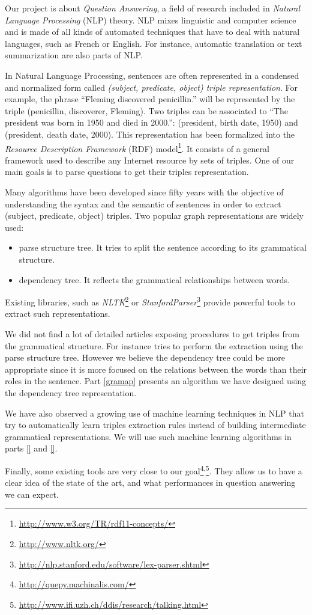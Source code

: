Our project is about \textit{Question Answering}, a field of research included in \textit{Natural Language Processing} (NLP) theory. NLP mixes linguistic and computer science and is made of all kinds of automated techniques that have to deal with natural languages, such as French or English. For instance, automatic translation or text summarization are also parts of NLP.

In Natural Language Processing, sentences are often represented in a condensed and normalized form called \textit{(subject, predicate, object) triple representation}. For example, the phrase ``Fleming discovered penicillin.'' will be represented by the triple (penicillin, discoverer, Fleming). Two triples can be associated to ``The president was born in 1950 and died in 2000.'': (president, birth date, 1950) and (president, death date, 2000). This representation has been formalized into the \textit{Resource Description Framework} (RDF) model\footnote{\url{http://www.w3.org/TR/rdf11-concepts/}}. It consists of a general framework used to describe any Internet resource by sets of triples. One of our main goals is to parse questions to get their triples representation.

Many algorithms have been developed since fifty years with the objective of understanding the syntax and the semantic of sentences in order to extract (subject, predicate, object) triples. Two popular graph representations are widely used:
\begin{itemize}
 \item parse structure tree. It tries to split the sentence according to its grammatical structure.
 \item dependency tree. It reflects the grammatical relationships between words.
\end{itemize}
Existing libraries, such as \textit{NLTK}\footnote{\url{http://www.nltk.org/}} or \textit{StanfordParser}\footnote{\url{http://nlp.stanford.edu/software/lex-parser.shtml}} provide powerful tools to extract such representations.

We did not find a lot of detailed articles exposing procedures to get triples from the grammatical structure. For instance \cite{parsetree} tries to perform the extraction using the parse structure tree. However we believe the dependency tree could be more appropriate since it is more focused on the relations between the words than their roles in the sentence. Part \ref{gramap} presents an algorithm we have designed using the dependency tree representation.

We have also observed a growing use of machine learning techniques in NLP that try to automatically learn triples extraction rules instead of building intermediate grammatical representations. We will use such machine learning algorithms in parts \ref{} and \ref{}.

Finally, some existing tools are very close to our goal\footnote{\url{http://quepy.machinalis.com/}}\textsuperscript{,}\footnote{\url{http://www.ifi.uzh.ch/ddis/research/talking.html}}. They allow us to have a clear idea of the state of the art, and what performances in question answering we can expect.

